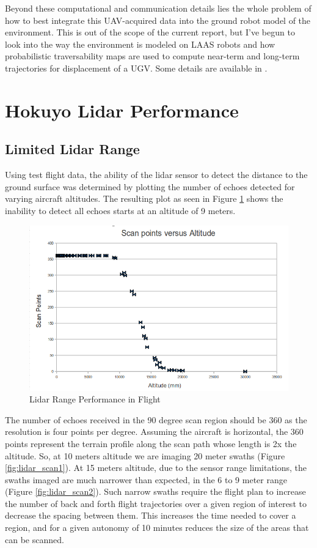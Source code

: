 \documentclass[a4paper,11pt]{report}
\begin{document}
Beyond these computational and communication details lies the whole problem of how to best integrate this UAV-acquired data into the ground robot model of the environment. This is out of the scope of the current report, but I've begun to look into the way the environment is modeled on LAAS robots and how probabilistic traversability maps are used to compute near-term and long-term trajectories for displacement of a UGV. Some details are available in \cite{redouane_paper}.

\section{Hokuyo Lidar Performance}
\label{hokuyo_perf}

\subsection{Limited Lidar Range}

Using test flight data, the ability of the lidar sensor to detect the distance to the ground surface was determined by plotting the number of echoes detected for varying aircraft altitudes. The resulting plot as seen in Figure \ref{fig:lidar_perf} shows the inability to detect all echoes starts at an altitude of 9 meters. 

\begin{figure}[ht]
 \centering
 \includegraphics[width=12cm]{scanpt_v_alt.png}
 \caption{Lidar Range Performance in Flight}
 \label{fig:lidar_perf}
\end{figure}

The number of echoes received in the 90 degree scan region should be 360 as the resolution is four points per degree. Assuming the aircraft is horizontal, the 360 points represent the terrain profile along the scan path whose length is 2x the altitude. So, at 10 meters altitude we are imaging 20 meter swaths (Figure \ref{fig:lidar_scan1}). At 15 meters altitude, due to the sensor range limitations, the swaths imaged are much narrower than expected, in the 6 to 9 meter range (Figure \ref{fig:lidar_scan2}). Such narrow swaths require the flight plan to increase the number of back and forth flight trajectories over a given region of interest to decrease the spacing between them. This increases the time needed to cover a region, and for a given autonomy of 10 minutes reduces the size of the areas that can be scanned.
\end{document}

